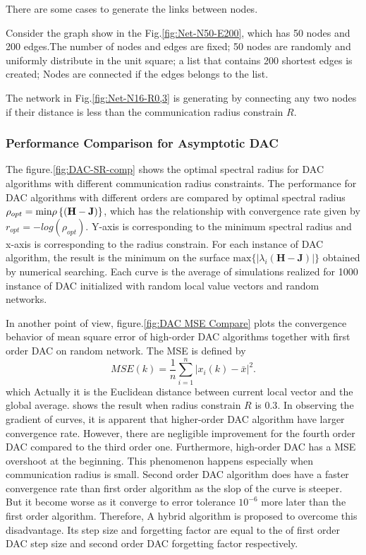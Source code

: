There are some cases to generate the links between nodes.
\begin{casenv}
\item Consider the graph show in the Fig.\ref{fig:Net-N50-E200}, which
has 50 nodes and 200 edges.The number of nodes and edges are fixed;
50 nodes are randomly and uniformly distribute in the unit square;
a list that contains 200 shortest edges is created; Nodes are connected
if the edges belongs to the list. 
\item The network in Fig.\ref{fig:Net-N16-R0,3} is generating by connecting
any two nodes if their distance is less than the communication radius
constrain $R$. 
\end{casenv}

\subsubsection{Performance Comparison for Asymptotic DAC}

The figure.\ref{fig:DAC-SR-comp} shows the optimal spectral radius
for DAC algorithms with different communication radius constraints.
The performance for DAC algorithms with different orders are compared
by optimal spectral radius $\rho_{opt}=\mbox{\mbox{min}}\rho\left\{ \left(\mathbf{H}-\mathbf{J}\right)\right\} $,
which has the relationship with convergence rate given by $r_{opt}=-log\left(\rho_{opt}\right)$.
Y-axis is corresponding to the minimum spectral radius and x-axis
is corresponding to the radius constrain. For each instance of DAC
algorithm, the result is the minimum on the surface $\mbox{max}\{\left|\lambda_{i}\left(\mathbf{H-J}\right)\right|\}$
obtained by numerical searching. Each curve is the average of simulations
realized for 1000 instance of DAC initialized with random local value
vectors and random networks.

In another point of view, figure.\ref{fig:DAC MSE Compare} plots
the convergence behavior of mean square error of high-order DAC algorithms
together with first order DAC on random network. The MSE is defined
by 
\begin{equation}
MSE(k)=\frac{1}{n}\sum_{i=1}^{n}\left|x_{i}(k)-\bar{x}\right|^{2}.
\end{equation}
which Actually it is the Euclidean distance between current local
vector and the global average. shows the result when radius constrain
$R$ is $0.3$. In observing the gradient of curves, it is apparent
that higher-order DAC algorithm have larger convergence rate. However,
there are negligible improvement for the fourth order DAC compared
to the third order one. Furthermore, high-order DAC has a MSE overshoot
at the beginning. This phenomenon happens especially when communication
radius is small. Second order DAC algorithm does have a faster convergence
rate than first order algorithm as the slop of the curve is steeper.
But it become worse as it converge to error tolerance $10^{-6}$ more
later than the first order algorithm. Therefore, A hybrid algorithm
is proposed to overcome this disadvantage. Its step size and forgetting
factor are equal to the of first order DAC step size and second order
DAC forgetting factor respectively.

